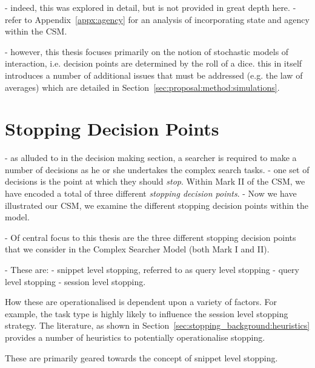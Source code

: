 - indeed, this was explored in detail, but is not provided in great depth here.
- refer to Appendix~\ref{appx:agency} for an analysis of incorporating state and agency within the CSM.

- however, this thesis focuses primarily on the notion of stochastic models of interaction, i.e. decision points are determined by the roll of a dice. this in itself introduces a number of additional issues that must be addressed (e.g. the law of averages) which are detailed in Section~\ref{sec:proposal:method:simulations}.

\section{Stopping Decision Points}\label{sec:proposal:stopping_points}
- as alluded to in the decision making section, a searcher is required to make a number of decisions as he or she undertakes the complex search tasks.
- one set of decisions is the point at which they should \emph{stop}. Within Mark II of the CSM, we have encoded a total of three different \emph{stopping decision points}.
- Now we have illustrated our CSM, we examine the different stopping decision points within the model.

- Of central focus to this thesis are the three different stopping decision points that we consider in the Complex Searcher Model (both Mark I and II).

- These are:
    - snippet level stopping, referred to as query level stopping
    - query level stopping
    - session level stopping.

How these are operationalised is dependent upon a variety of factors. For example, the task type is highly likely to influence the session level stopping strategy. The literature, as shown in Section~\ref{sec:stopping_background:heuristics} provides a number of heuristics to potentially operationalise stopping.

These are primarily geared towards the concept of snippet level stopping.

